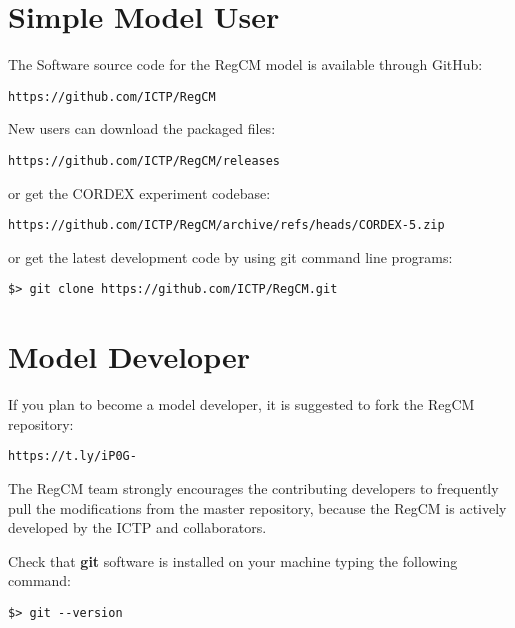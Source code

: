 %
%

\section{Simple Model User}

The Software source code for the RegCM model is available through GitHub:

\begin{Verbatim}
https://github.com/ICTP/RegCM
\end{Verbatim}

New users can download the packaged files:

\begin{Verbatim}
https://github.com/ICTP/RegCM/releases
\end{Verbatim}

or get the CORDEX experiment codebase:

\begin{Verbatim}
https://github.com/ICTP/RegCM/archive/refs/heads/CORDEX-5.zip
\end{Verbatim}

or get the latest development code by using git command line programs:

\begin{Verbatim}
$> git clone https://github.com/ICTP/RegCM.git
\end{Verbatim}


\section{Model Developer}

If you plan to become a model developer, it is suggested to fork the RegCM
repository:

\begin{Verbatim}
https://t.ly/iP0G-
\end{Verbatim}

The RegCM team strongly encourages the contributing developers to frequently
pull the modifications from the master repository, because the RegCM is
actively developed by the ICTP and collaborators.

Check that {\bf git} software is installed on your machine typing
the following command:

\begin{verbatim}
$> git --version
\end{verbatim}
